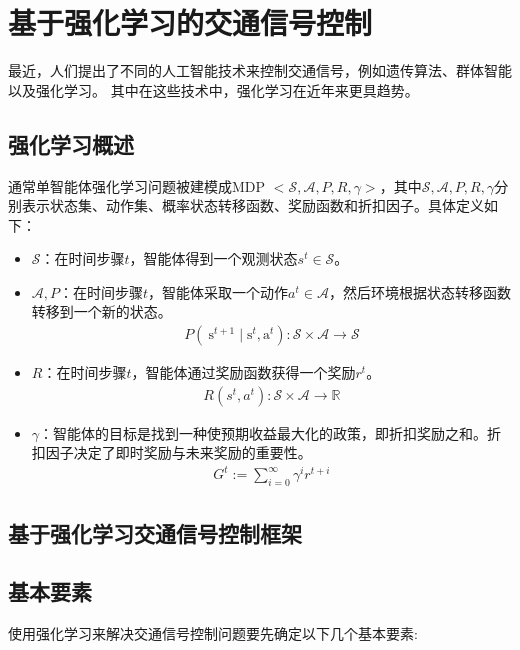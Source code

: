 \section{基于强化学习的交通信号控制}
最近，人们提出了不同的人工智能技术来控制交通信号，例如遗传算法、群体智能以及强化学习。 其中在这些技术中，强化学习在近年来更具趋势。
\subsection{强化学习概述}
通常单智能体强化学习问题被建模成MDP $<\mathcal{S}, \mathcal{A}, P, R, \gamma>$，其中$\mathcal{S}, \mathcal{A}, P, R, \gamma$分别表示状态集、动作集、概率状态转移函数、奖励函数和折扣因子。具体定义如下：
\begin{itemize}
    \item $\mathcal{S}$：在时间步骤$t$，智能体得到一个观测状态$s^t \in \mathcal{S}$。
    \item $\mathcal{A}, P$：在时间步骤$t$，智能体采取一个动作$a^t \in \mathcal{A}$，然后环境根据状态转移函数转移到一个新的状态。
    \begin{align}
        P\left(\mathrm{~s}^{t+1} \mid \mathrm{s}^{t}, \mathrm{a}^{t}\right): \mathcal{S} \times \mathcal{A} \rightarrow \mathcal{S}
    \end{align}
    \item $R$：在时间步骤$t$，智能体通过奖励函数获得一个奖励$r^t$。
    \begin{align}
        R\left(s^{t}, a^{t}\right): \mathcal{S} \times \mathcal{A} \rightarrow \mathbb{R}
    \end{align}
    \item $\gamma$：智能体的目标是找到一种使预期收益最大化的政策，即折扣奖励之和。折扣因子决定了即时奖励与未来奖励的重要性。
    \begin{align}
        G^{t}:=\sum_{i=0}^{\infty} \gamma^{i} r^{t+i}
    \end{align}
  \end{itemize}
\subsection{基于强化学习交通信号控制框架}

\subsection{基本要素}
使用强化学习来解决交通信号控制问题要先确定以下几个基本要素:


